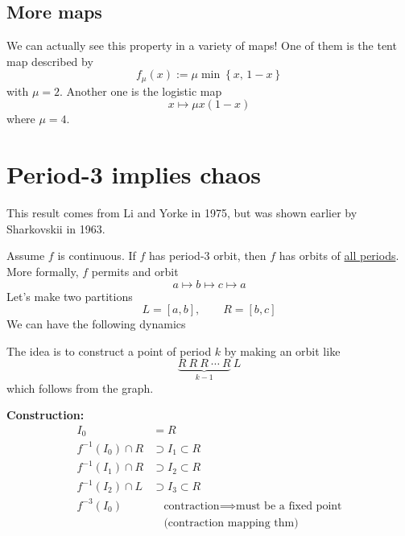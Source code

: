 \documentclass{article}
\begin{document}
\subsection{More maps}

We can actually see this property in a variety of maps! One of them is 
the tent map described by 
\[
f_\mu(x) := \mu \operatorname{min}\left\{x,\, 1-x\right\}
\]
with $\mu=2$. Another one is the logistic map
\[
x\mapsto \mu x (1-x)
\]
where $\mu=4$.

\section{Period-3 implies chaos}

This result comes from Li and Yorke in 1975, but was shown earlier by Sharkovskii in 1963.

Assume $f$ is continuous. If $f$ has period-3 orbit, then $f$ has orbits of \underline{all periods}. More formally, $f$ permits and orbit 
\[
a\mapsto b \mapsto c \mapsto a
\]
Let's make two partitions 
\[
L=[a,b],\qquad R=[b,c]
\]
We can have the following dynamics 


\noindent
The idea is to construct a point of period $k$ by making an orbit like
\[
\underbrace{R\ R\ R\ \cdots\ R}_{k-1}\ L
\]
which follows from the graph.

\noindent \textbf{Construction:}
\begin{align*}
I_0 &= R \\
f^{-1}(I_0) \cap R &\supset I_1 \subset R \\
f^{-1}(I_1) \cap R &\supset I_2 \subset R \\
f^{-1}(I_2) \cap L &\supset I_3 \subset R \\
f^{-3}(I_0) & \quad \text{contraction} \implies \text{must be a fixed point} \\
& \quad \text{(contraction mapping thm)}
\end{align*}
\end{document}
